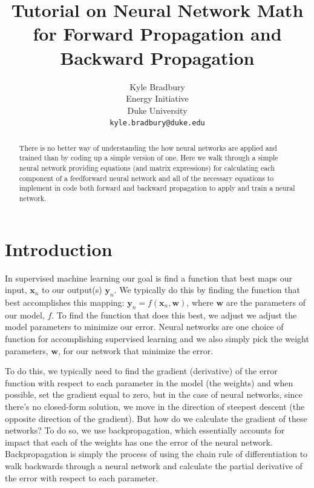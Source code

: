 \documentclass{article}
\title{Tutorial on Neural Network Math for Forward Propagation and Backward Propagation}
\author{
  Kyle Bradbury \\
  Energy Initiative\\
  Duke University\\
  \texttt{kyle.bradbury@duke.edu} \\
}
\begin{document}
\maketitle

\begin{abstract}
There is no better way of understanding the how neural networks are applied and trained than by coding up a simple version of one. Here we walk through a simple neural network providing equations (and matrix expressions) for calculating each component of a feedforward neural network and all of the necessary equations to implement in code both forward and backward propagation to apply and train a neural network.
\end{abstract}



\section{Introduction}

In supervised machine learning our goal is find a function that best maps our input, $\mathbf{x}_n$ to our output(s) $\mathbf{y}_n$. We typically do this by finding the function that best accomplishes this mapping: $\mathbf{y}_n = f(\mathbf{x}_n, \mathbf{w})$, where $\mathbf{w}$ are the parameters of our model, $f$. To find the function that does this best, we adjust we adjust the model parameters to minimize our error. Neural networks are one choice of function for accomplishing supervised learning and we also simply pick the weight parameters, $\mathbf{w}$, for our network that minimize the error.

To do this, we typically need to find the gradient (derivative) of the error function with respect to each parameter in the model (the weights) and when possible, set the gradient equal to zero, but in the case of neural networks, since there's no closed-form solution, we move in the direction of steepest descent (the opposite direction of the gradient). But how do we calculate the gradient of these networks? To do so, we use backpropagation, which essentially accounts for impact that each of the weights has one the error of the neural network. Backpropagation is simply the process of using the chain rule of differentiation to walk backwards through a neural network and calculate the partial derivative of the error with respect to each parameter.
\end{document}
